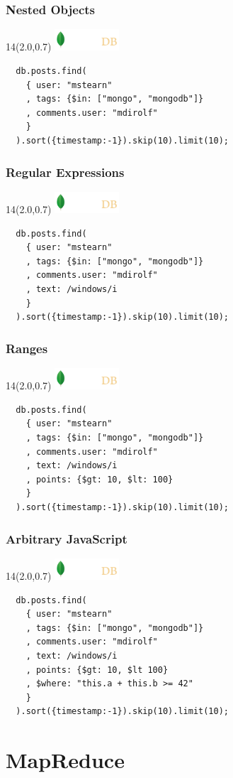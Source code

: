 \documentclass{beamer}
\newcommand{\MongoLogo}{
\begin{textblock}{14}(2.0,0.7)
  \includegraphics[height=0.8cm]{logo-mongodb-ondark.png}
\end{textblock}
}
\begin{document}
\begin{frame}[fragile]
  \frametitle{Nested Objects}
  \MongoLogo

  \begin{verbatim}
  db.posts.find(
    { user: "mstearn"
    , tags: {$in: ["mongo", "mongodb"]}
    , comments.user: "mdirolf"
    }
  ).sort({timestamp:-1}).skip(10).limit(10);
  \end{verbatim}
  
\end{frame}
\begin{frame}[fragile]
  \frametitle{Regular Expressions}
  \MongoLogo

  \begin{verbatim}
  db.posts.find(
    { user: "mstearn"
    , tags: {$in: ["mongo", "mongodb"]}
    , comments.user: "mdirolf"
    , text: /windows/i
    }
  ).sort({timestamp:-1}).skip(10).limit(10);
  \end{verbatim}
  
\end{frame}
\begin{frame}[fragile]
  \frametitle{Ranges}
  \MongoLogo

  \begin{verbatim}
  db.posts.find(
    { user: "mstearn"
    , tags: {$in: ["mongo", "mongodb"]}
    , comments.user: "mdirolf"
    , text: /windows/i
    , points: {$gt: 10, $lt: 100}
    }
  ).sort({timestamp:-1}).skip(10).limit(10);
  \end{verbatim}
  
\end{frame}
\begin{frame}[fragile]
  \frametitle{Arbitrary JavaScript}
  \MongoLogo

  \begin{verbatim}
  db.posts.find(
    { user: "mstearn"
    , tags: {$in: ["mongo", "mongodb"]}
    , comments.user: "mdirolf"
    , text: /windows/i
    , points: {$gt: 10, $lt 100}
    , $where: "this.a + this.b >= 42"
    }
  ).sort({timestamp:-1}).skip(10).limit(10);
  \end{verbatim}
\end{frame}


\section{MapReduce}
\end{document}
